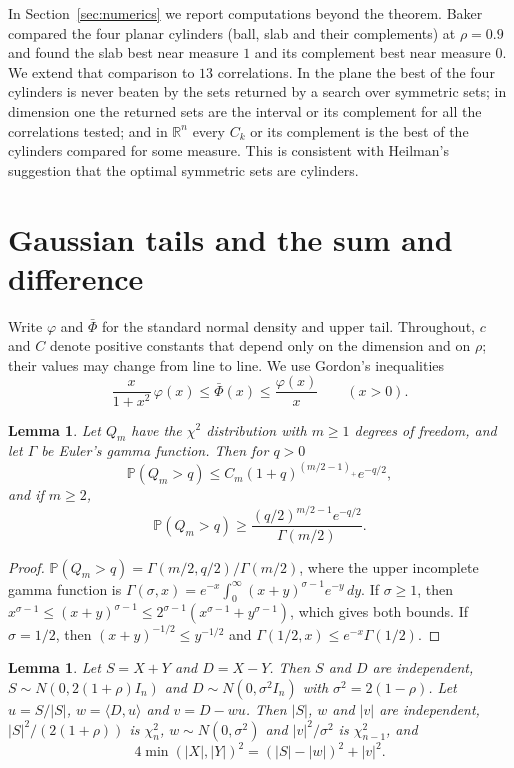 \documentclass[11pt]{amsart}
\newtheorem{lemma}[theorem]{Lemma}
\theoremstyle{remark}
\newcommand{\R}{\mathbb{R}}
\newcommand{\Prob}{\mathbb{P}}
\begin{document}
In Section~\ref{sec:numerics} we report computations beyond the theorem. Baker~\cite[Section~3.4]{Baker} compared the
four planar cylinders (ball, slab and their complements) at $\rho=0.9$ and found the slab best near measure $1$ and its
complement best near measure $0$. We extend that comparison to $13$ correlations. In the plane the best of the four
cylinders is never beaten by the sets returned by a search over symmetric sets; in dimension one the returned sets are
the interval or its complement for all the correlations tested; and in $\R^n$ every $C_k$ or its complement is the
best of the cylinders compared for some measure. This is consistent with Heilman's suggestion that the optimal
symmetric sets are cylinders.

\section{Gaussian tails and the sum and difference}\label{sec:lemmas}

Write $\varphi$ and $\bar\Phi$ for the standard normal density and upper tail. Throughout, $c$ and $C$ denote positive
constants that depend only on the dimension and on $\rho$; their values may change from line to line. We use Gordon's inequalities~\cite{Gordon}
\begin{equation}\label{eq:mills}
\frac{x}{1+x^2}\,\varphi(x)\le\bar\Phi(x)\le\frac{\varphi(x)}{x}\qquad(x>0).
\end{equation}

\begin{lemma}\label{lem:chi}
Let $Q_m$ have the $\chi^2$ distribution with $m\ge1$ degrees of freedom, and let $\Gamma$ be Euler's gamma function.
Then for $q>0$
\[
\Prob(Q_m>q)\le C_m(1+q)^{(m/2-1)_+}e^{-q/2},
\]
and if $m\ge2$,
\[
\Prob(Q_m>q)\ge\frac{(q/2)^{m/2-1}e^{-q/2}}{\Gamma(m/2)}.
\]
\end{lemma}

\begin{proof}
$\Prob(Q_m>q)=\Gamma(m/2,q/2)/\Gamma(m/2)$, where the upper incomplete gamma function is $\Gamma(\sigma,x)=e^{-x}\int_0^\infty(x+y)^{\sigma-1}e^{-y}\,dy$. If
$\sigma\ge1$, then $x^{\sigma-1}\le(x+y)^{\sigma-1}\le2^{\sigma-1}(x^{\sigma-1}+y^{\sigma-1})$, which gives both bounds.
If $\sigma=1/2$, then $(x+y)^{-1/2}\le y^{-1/2}$ and $\Gamma(1/2,x)\le e^{-x}\Gamma(1/2)$.
\end{proof}

\begin{lemma}\label{lem:decomp}
Let $S=X+Y$ and $D=X-Y$. Then $S$ and $D$ are independent, $S\sim N(0,2(1+\rho)I_n)$ and $D\sim N(0,\sigma^2I_n)$ with
$\sigma^2=2(1-\rho)$. Let $u=S/|S|$, $w=\langle D,u\rangle$ and $v=D-wu$. Then $|S|$, $w$ and $|v|$ are independent,
$|S|^2/(2(1+\rho))$ is $\chi^2_n$, $w\sim N(0,\sigma^2)$ and $|v|^2/\sigma^2$ is $\chi^2_{n-1}$, and
\begin{equation}\label{eq:min}
4\min(|X|,|Y|)^2=(|S|-|w|)^2+|v|^2.
\end{equation}
\end{lemma}
\end{document}
